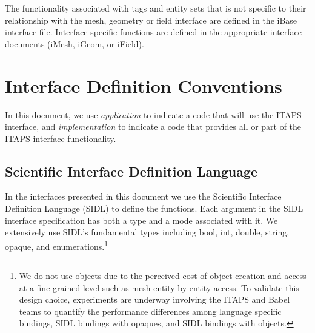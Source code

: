 \documentclass{article}
\begin{document}
The functionality associated with tags and entity sets that is 
not specific to their relationship with the mesh, geometry or 
field interface are defined in the iBase interface file. Interface 
specific functions are defined in the appropriate interface documents 
(iMesh, iGeom, or iField).


\section{Interface Definition Conventions}

In this document, we use \textit{application} to indicate a code that 
will use the ITAPS interface, and \textit{implementation} to indicate 
a code that provides all or part of the ITAPS interface functionality.


\subsection{Scientific Interface Definition Language}

In the interfaces presented in this document we use the Scientific 
Interface Definition Language (SIDL) to define the functions. 
Each argument in the SIDL interface specification has both a 
type and a mode associated with it. We extensively use SIDL's 
fundamental types including bool, int, double, string, opaque, 
and enumerations.\footnote{{\small We do not use objects due to the perceived 
cost of object creation and access at a fine grained level such 
as mesh entity by entity access. To validate this design choice, 
experiments are underway involving the ITAPS and Babel teams to 
quantify the performance differences among language specific 
bindings, SIDL bindings with opaques, and SIDL bindings with 
objects.} }\\
\end{document}
